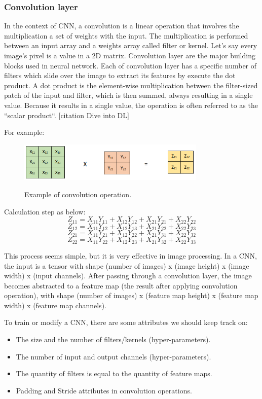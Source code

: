 \subsubsection{Convolution layer}

\noindent

	In the context of CNN, a convolution is a linear operation that involves the multiplication a set of weights with the input. The multiplication is performed between an input array and a weights array called filter or kernel. Let’s say every image’s pixel is a value in a 2D matrix. Convolution layer are the major building blocks used in neural network. Each of convolution layer has a specific number of filters which slide over the image to extract its features by execute the dot product. A dot product is the element-wise multiplication between the filter-sized patch of the input and filter, which is then summed, always resulting in a single value. Because it results in a single value, the operation is often referred to as the “scalar product“. [citation Dive into DL]
	
	For example:

	\begin{figure}[H]
		\centering
		{\includegraphics[width=0.8\textwidth]{./hinhanh/chap3/conv_operation.png}}
		\caption{Example of convolution operation.}
	\end{figure}
	
	Calculation step as below:
	\[Z_{11} = X_{11}Y_{11} + X_{12}Y_{12} + X_{21}Y_{21} + X_{22}Y_{22}\]
	\[Z_{12} = X_{11}Y_{12} + X_{12}Y_{13} + X_{21}Y_{22} + X_{22}Y_{23}\]
	\[Z_{21} = X_{11}Y_{21} + X_{12}Y_{22} + X_{21}Y_{31} + X_{22}Y_{32}\]
	\[Z_{22} = X_{11}Y_{22} + X_{12}Y_{23} + X_{21}Y_{32} + X_{22}Y_{33}\]
	
	This process seems simple, but it is very effective in image processing. In a CNN, the input is a tensor with shape (number of images) x (image height) x (image width) x (input channels). After passing through a convolution layer, the image becomes abstracted to a feature map (the result after applying convolution operation), with shape (number of images) x (feature map height) x (feature map width) x (feature map channels).
	
	To train or modify a CNN, there are some attributes we should keep track on:
	\begin{itemize}
		\item The size and the number of filters/kernels (hyper-parameters).
		\item The number of input and output channels (hyper-parameters).
		\item The quantity of filters is equal to the quantity of feature maps.
		\item Padding and Stride attributes in convolution operations.
	\end{itemize}


